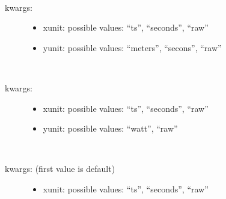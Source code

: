 \documentclass[letterpaper,10pt,openany,oneside,english]{sphinxmanual}
\begin{document}
\begin{fulllineitems}
\begin{fulllineitems}
\begin{description}
\begin{itemize}
\end{itemize}

\end{description}

\end{fulllineitems}


\begin{fulllineitems}
\label{\detokenize{plots:plots.SimplePlotter.bunch_length}}~\begin{description}
\item[{kwargs:  }] \leavevmode\begin{itemize}
\item {} 
xunit: possible values: “ts”, “seconds”, “raw”

\item {} 
yunit: possible values: “meters”, “secons”, “raw”

\end{itemize}

\end{description}

\end{fulllineitems}


\begin{fulllineitems}
\label{\detokenize{plots:plots.SimplePlotter.csr_intensity}}~\begin{description}
\item[{kwargs:  }] \leavevmode\begin{itemize}
\item {} 
xunit: possible values: “ts”, “seconds”, “raw”

\item {} 
yunit: possible values: “watt”, “raw”

\end{itemize}

\end{description}

\end{fulllineitems}


\begin{fulllineitems}
\label{\detokenize{plots:plots.SimplePlotter.bunch_position}}~\begin{description}
\item[{kwargs: (first value is default)  }] \leavevmode\begin{itemize}
\item {} 
xunit: possible values: “ts”, “seconds”, “raw”


\end{itemize}
\end{description}
\end{fulllineitems}
\end{fulllineitems}
\end{document}
